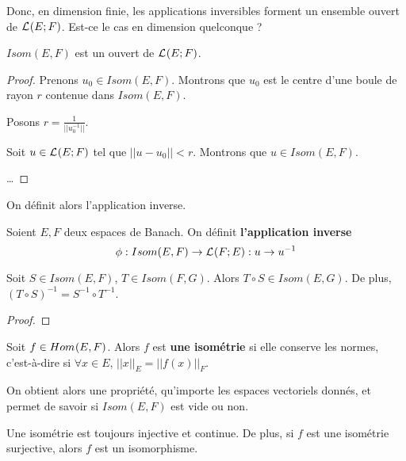 Donc, en dimension finie, les applications inversibles forment un ensemble
ouvert de $\mathcal{L}_{}(E; F)$. Est-ce le cas en dimension quelconque ?

\begin{proposition}
	$Isom(E, F)$ est un ouvert de $\mathcal{L}_{}(E; F)$.
\end{proposition}

\ifdefined\outputproof
\begin{proof}
	Prenons $u_{0} \in Isom(E, F)$. Montrons que $u_{0}$ est le centre d'une
	boule de rayon $r$ contenue dans $Isom(E, F)$.

	Posons $r = \frac{1}{||u_{0}^{-1}||}$.

	Soit $u \in \mathcal{L}_{}(E; F)$ tel que $||u - u_{0}|| < r$. Montrons
	que $u \in Isom(E, F)$.

	\ldots
\end{proof}
\fi

On définit alors l'application inverse.

\begin{definition}
	Soient $E, F$ deux espaces de Banach. On définit \textbf{l'application
	inverse}
	\begin{equation*}
		\phi : Isom(E, F) \rightarrow \mathcal{L}_{}(F; E) : u \rightarrow u^{-1}
	\end{equation*}
\end{definition}

\begin{proposition}
	Soit $S \in Isom(E, F)$, $T \in Isom(F, G)$.
	Alors $T \circ S \in Isom(E, G)$. De plus, $(T \circ S)^{-1} = S^{-1} \circ
	T^{-1}$.
\end{proposition}

\ifdefined\outputproof
\begin{proof}

\end{proof}
\fi

\begin{definition}
\label{definition:isometrie}
	Soit $f \in Hom_{}(E, F)$.
	Alors $f$ est \textbf{une isométrie} si elle conserve les normes, c'est-à-dire si
	$\forall x \in E$, $||x||_{E} =  ||f(x)||_{F}$.
\end{definition}

On obtient alors une propriété, qu'importe les espaces vectoriels donnés, et
permet de savoir si $Isom(E, F)$ est vide ou non.

\begin{proposition}
	Une isométrie est toujours injective et continue. De plus, si $f$ est une
	isométrie surjective, alors $f$ est un isomorphisme.
\end{proposition}

